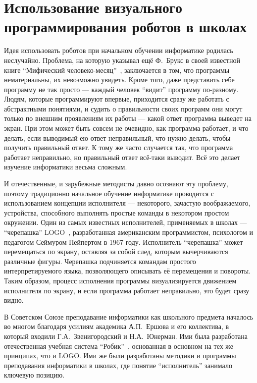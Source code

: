 \documentclass[a4paper]{article}
\begin{document}
\section{Использование визуального программирования роботов в школах}
Идея использовать роботов при начальном обучении информатике родилась неслучайно. Проблема, на которую указывал ещё Ф.~Брукс в своей известной книге ``Мифический человеко-месяц''~\cite{mythicalManMonth}, заключается в том, что программы нематериальны, их невозможно увидеть. Кроме того, даже представить себе программу не так просто --- каждый человек ``видит'' программу по-разному. Людям, которые программируют впервые, приходится сразу же работать с абстрактными понятиями, и судить о правильности своих программ они могут только по внешним проявлениям их работы --- какой ответ программа выведет на экран. При этом может быть совсем не очевидно, как программа работает, и что делать, если выводимый ею ответ неправильный, что нужно делать, чтобы получить правильный ответ. К тому же часто случается так, что программа работает неправильно, но правильный ответ всё-таки выводит. Всё это делает изучение информатики весьма сложным.

И отечественные, и зарубежные методисты давно осознают эту проблему, поэтому традиционно начальное обучение информатике проводится с использованием концепции исполнителя --- некоторого, зачастую воображаемого, устройства, способного выполнять простые команды в некотором простом окружении. Один из самых известных исполнителей, применяемых в школах --- ``черепашка'' LOGO~\cite{logo}, разработанная американским программистом, психологом и педагогом Сеймуром Пейпертом в 1967 году. Исполнитель ``черепашка'' может перемещаться по экрану, оставляя за собой след, которым вычерчиваются различные фигуры. Черепашка подчиняется командам простого интерпретируемого языка, позволяющего описывать её перемещения и повороты. Таким образом, процесс исполнения программы визуализируется движением исполнителя по экрану, и если программа работает неправильно, это будет сразу видно. 

В Советском Союзе преподавание информатики как школьного предмета началось во многом благодаря усилиям академика А.П.~Ершова и его коллектива, в который входили Г.А.~Звенигородский и Н.А.~Юнерман. Ими была разработана отечественная учебная система ``Робик''~\cite{robik}, основанная в основном на тех же принципах, что и LOGO. Ими же были разработаны методики и программы преподавания информатики в школах, где понятие ``исполнитель'' занимало ключевую позицию.
\end{document}
